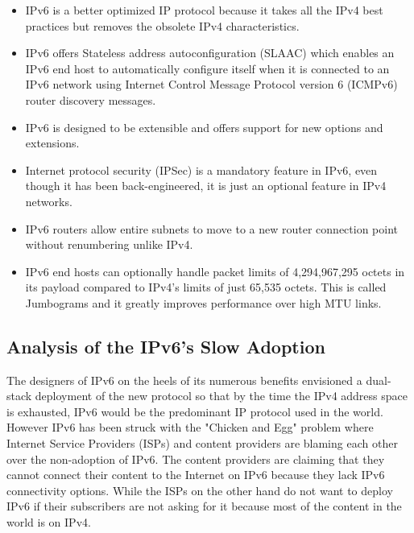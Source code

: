 \documentclass[iwp,first]{luthesis}
\begin{document}
\begin{itemize}

\item IPv6 is a better optimized IP protocol because it takes all the IPv4 best practices but removes the obsolete IPv4 characteristics.

\item IPv6 offers Stateless address autoconfiguration (SLAAC) which enables an IPv6 end host to automatically configure itself when it is connected to an IPv6 network using Internet Control Message Protocol version 6 (ICMPv6) router discovery messages.

\item IPv6 is designed to be extensible and offers support for new options and extensions. 

\item Internet protocol security (IPSec) is a mandatory feature in IPv6, even though it has been back-engineered, it is just an optional feature in IPv4 networks.

\item IPv6 routers allow entire subnets to move to a new router connection point without renumbering unlike IPv4. 

\item IPv6 end hosts can optionally handle packet limits of 4,294,967,295 octets in its payload compared to IPv4's limits of just 65,535 octets. This is called Jumbograms and it greatly improves performance over high MTU links.

\end{itemize}

\subsection{Analysis of the IPv6's Slow Adoption}

The designers of IPv6 on the heels of its numerous benefits envisioned a dual-stack deployment of the new protocol so that by the time the IPv4 address space is exhausted, IPv6 would be the predominant IP protocol used in the world. However IPv6 has been struck with the "Chicken and Egg" problem where Internet Service Providers (ISPs) and content providers are blaming each other over the non-adoption of IPv6. The content providers are claiming that they cannot connect their content to the Internet on IPv6 because they lack IPv6 connectivity options. While the ISPs on the other hand do not want to deploy IPv6 if their subscribers are not asking for it because most of the content in the world is on IPv4. 
\end{document}
